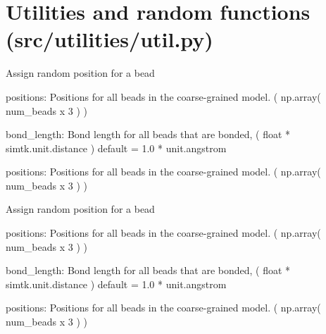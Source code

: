 \documentclass[letterpaper,12pt,english,openany,oneside]{sphinxmanual}
\begin{document}
\section{Utilities and random functions (src/utilities/util.py)}
\label{\detokenize{utilities:module-utilities.util}}\label{\detokenize{utilities:utilities-and-random-functions-src-utilities-util-py}}

\begin{fulllineitems}
\label{\detokenize{utilities:utilities.util.assign_position}}
Assign random position for a bead

positions: Positions for all beads in the coarse-grained model.
( np.array( num\_beads x 3 ) )

bond\_length: Bond length for all beads that are bonded,
( float * simtk.unit.distance )
default = 1.0 * unit.angstrom

positions: Positions for all beads in the coarse-grained model.
( np.array( num\_beads x 3 ) )

\end{fulllineitems}


\begin{fulllineitems}
\label{\detokenize{utilities:utilities.util.assign_position_lattice_style}}
Assign random position for a bead

positions: Positions for all beads in the coarse-grained model.
( np.array( num\_beads x 3 ) )

bond\_length: Bond length for all beads that are bonded,
( float * simtk.unit.distance )
default = 1.0 * unit.angstrom

positions: Positions for all beads in the coarse-grained model.
( np.array( num\_beads x 3 ) )

\end{fulllineitems}
\end{document}
